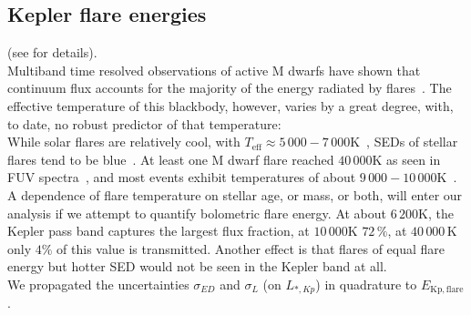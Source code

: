 \documentclass{aa}
\begin{document}
\subsection{Kepler flare energies}
(see  for details).
\\
Multiband time resolved observations of active M dwarfs have shown that continuum flux accounts for the majority  of the energy radiated by flares~\citep{kowalski_time-resolved_2013}. %
The effective temperature of this blackbody, however, varies by a great degree, with, to date, no robust predictor of that temperature:
\\
While solar flares are relatively cool, with \mbox{$T_\mathrm{eff}\approx5\,000-7\,000 $\;K}~\citep{kleint_solarstellarwlf_2016, kerr_solarstellarwlf_2014, watanabe_solarstellarwlf_2013, namekata_solarstellarwlf_2017}, SEDs of stellar flares tend to be blue~\citep{davenport_multi-wavelength_2012}. At least one M dwarf flare reached $40\,000$\;K as seen in FUV spectra~\citep{froning_40000_2019}, and most events exhibit temperatures of about $9\,000-10\,000$\;K~\citep{1992ApJS...78..565H, kretzschmar_sun_2011, shibayama_superflares_2013}.
A dependence of flare temperature on stellar age, or mass, or both, will enter our analysis if we attempt to quantify bolometric flare energy. At about $6\,200$\;K, the Kepler pass band captures the largest flux fraction, at $10\,000$\;K $72\,\%$, at $40\,000$\,K only $4\%$ of this value is transmitted. Another effect is that flares of equal flare energy but hotter SED would not be seen in the Kepler band at all.
\\
We propagated the uncertainties $\sigma_{ED}$ and $\sigma_L$ (on $L_{*,Kp}$) in quadrature to $E_\mathrm{Kp,flare}$.
\\
\end{document}
